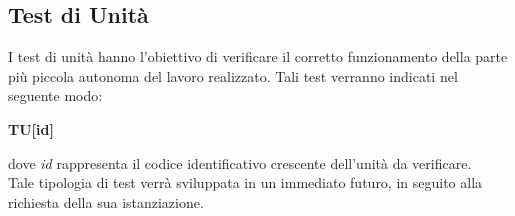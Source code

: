 \subsection{Test di Unità}
I test di unità hanno l'obiettivo di verificare il corretto funzionamento della 
parte più piccola autonoma del lavoro realizzato. Tali test verranno indicati nel
seguente modo:\\
	\centerline{\textbf{TU[id]}}
dove \textit{id} rappresenta il codice identificativo crescente dell'unità da verificare.\\
Tale tipologia di test verrà sviluppata in un immediato futuro, in seguito alla richiesta della sua istanziazione.
